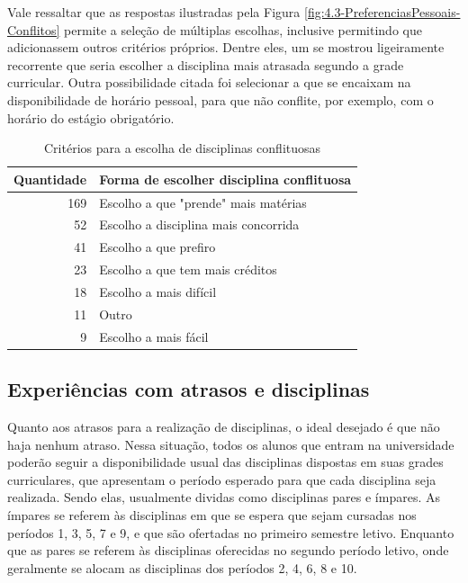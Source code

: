 Vale ressaltar que as respostas ilustradas pela Figura \ref{fig:4.3-PreferenciasPessoais-Conflitos} permite a seleção de múltiplas escolhas, inclusive permitindo que adicionassem outros critérios próprios. Dentre eles, um se mostrou ligeiramente recorrente que seria escolher a disciplina mais atrasada segundo a grade curricular. Outra possibilidade citada foi selecionar a que se encaixam na disponibilidade de horário pessoal, para que não conflite, por exemplo, com o horário do estágio obrigatório.

\begin{table}[htbp]
  \centering
  \caption{\label{table:4.3-PreferenciasPessoais-Conflitos}Critérios para a escolha de disciplinas conflituosas}
  \begin{tabular}{| r l |}
    \hline
    \textbf{Quantidade} & \textbf{Forma de escolher disciplina conflituosa} \\
    \hline
    169                 & Escolho a que "prende" mais matérias              \\
    52                  & Escolho a disciplina mais concorrida              \\
    41                  & Escolho a que prefiro                             \\
    23                  & Escolho a que tem mais créditos                   \\
    18                  & Escolho a mais difícil                            \\
    11                  & Outro                                             \\
    9                   & Escolho a mais fácil                              \\
    \hline
  \end{tabular}
\end{table}

\subsection{Experiências com atrasos e disciplinas} %

Quanto aos atrasos para a realização de disciplinas, o ideal desejado é que não haja nenhum atraso. Nessa situação, todos os alunos que entram na universidade poderão seguir a disponibilidade usual das disciplinas dispostas em suas grades curriculares, que apresentam o período esperado para que cada disciplina seja realizada. Sendo elas, usualmente dividas como disciplinas pares e ímpares. As ímpares se referem às disciplinas em que se espera que sejam cursadas nos períodos 1, 3, 5, 7 e 9, e que são ofertadas no primeiro semestre letivo. Enquanto que as pares se referem às disciplinas oferecidas no segundo período letivo, onde geralmente se alocam as disciplinas dos períodos 2, 4, 6, 8 e 10.

